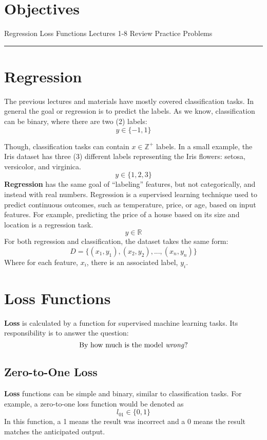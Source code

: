 \usepackage{tikz} %
\section*{Objectives}
\begin{outline}
    \1 Regression
    \1 Loss Functions
    \1 Lectures 1-8 Review
    \1 Practice Problems
\end{outline}

\rule[0.0051in]{\textwidth}{0.00025in}

\section{Regression}
The previous lectures and materials have mostly covered classification tasks. In general the goal or regression is to predict the labels.  As we know, classification can be binary, where there are two (2) labels: 
\[
y \in \{-1, 1\}
\]

Though, classification tasks can contain $x\mathbb{\in Z^+}$ labels. In a small example, the Iris dataset has three (3) different labels representing the Iris flowers: setosa, versicolor, and virginica.
\[
y \in \{1, 2, 3\}
\]
\textbf{Regression} has the same goal of ``labeling'' features, but not categorically, and instead with real numbers. Regression is a supervised learning technique used to predict continuous outcomes, such as temperature, price, or age, based on input features. For example, predicting the price of a house based on its size and location is a regression task.
\[
y \in \mathbb{R}
\]
For both regression and classification, the dataset takes the same form:
\[
D = \{(x_1, y_1), (x_2, y_2),...,(x_n, y_n)\}
\]
Where for each feature, $x_i$, there is an associated label, $y_i$.

\section{Loss Functions}
\textbf{Loss} is calculated by a function for supervised machine learning tasks. Its responsibility is to answer the question: 
\[
\text{By how much is the model \textit{wrong}?}
\]

\subsection{Zero-to-One Loss}
\textbf{Loss} functions can be simple and binary, similar to classification tasks. For example, a zero-to-one loss function would be denoted as
\[
l_{01} \in \{0, 1\}
\]
In this function, a 1 means the result was incorrect and a 0 means the result matches the anticipated output.

